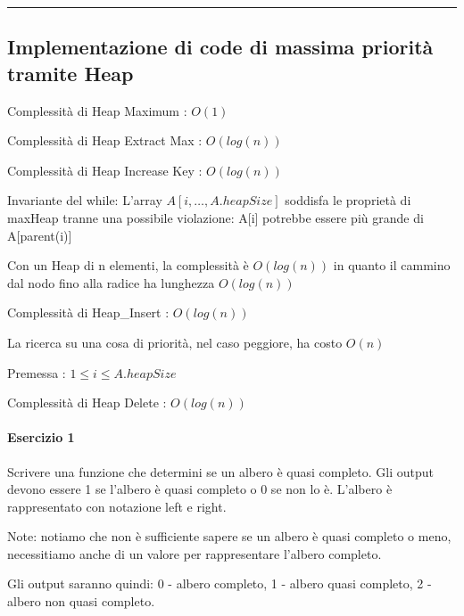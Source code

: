 \begin{center}\rule{0.5\linewidth}{\linethickness}\end{center}

\subsection{Implementazione di code di massima priorità tramite Heap}



{Complessità di Heap Maximum : $O(1)$}



{Complessità di Heap Extract Max : $O(log(n))$}



{Complessità di Heap Increase Key : $O(log(n))$}

{Invariante del while: L'array $A[i,\ldots,A.heapSize]$ soddisfa le proprietà di maxHeap tranne una possibile violazione: A{[}i{]} potrebbe essere più grande di A{[}parent(i){]}}

{Con un Heap di n elementi, la complessità è $O(log(n))$ in quanto il cammino dal nodo fino alla radice ha lunghezza }$O(log(n))$



{Complessità di Heap\_Insert : }$O(log(n))$

{La ricerca su una cosa di priorità, nel caso peggiore, ha costo }$O(n)$

{Premessa : $1 \leq i \leq A.heapSize$}



{Complessità di Heap Delete : }$O(log(n))$

\paragraph{Esercizio 1}

{Scrivere una funzione che determini se un albero è quasi completo. Gli output devono essere 1 se l'albero è quasi completo o 0 se non lo è. }{L'albero è rappresentato con notazione left e right.}

{Note: notiamo che non è sufficiente sapere se un albero è quasi completo o meno, necessitiamo anche di un valore per rappresentare l'albero completo.}

{Gli output saranno quindi: 0 - albero completo, 1 - albero quasi completo, 2 - albero non quasi completo.}

